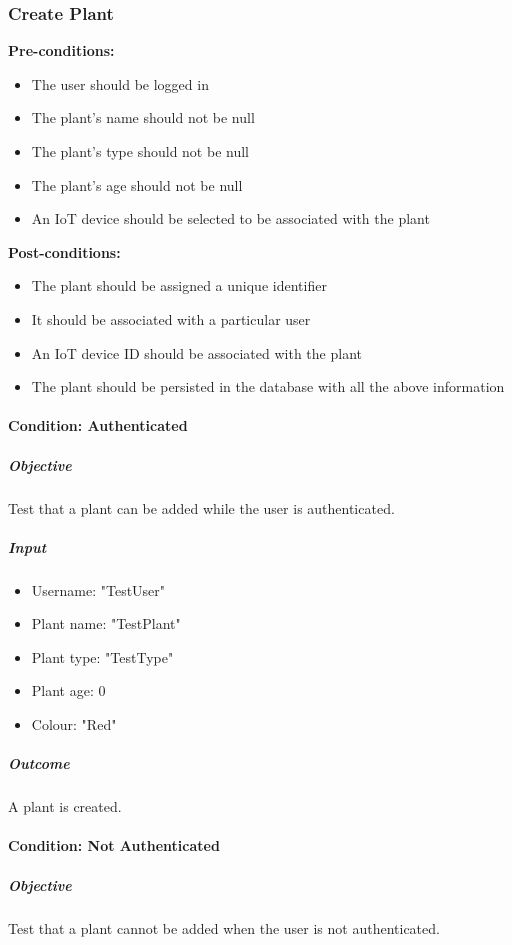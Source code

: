 \documentclass{article}
\begin{document}
		\subsubsection{Create Plant}
		
		\textbf{Pre-conditions:}
		\begin{itemize}
			\item The user should be logged in
			\item The plant's name should not be null
			\item The plant's type should not be null
			\item The plant's age should not be null
			\item An IoT device should be selected to be associated with the plant
		\end{itemize}
		\textbf{Post-conditions:}
		\begin{itemize}
			\item The plant should be assigned a unique identifier
			\item It should be associated with a particular user
			\item An IoT device ID should be associated with the plant
			\item The plant should be persisted in the database with all the above information
		\end{itemize}
			
		\paragraph{Condition: Authenticated}
		\subparagraph{Objective}
		Test that a plant can be added while the user is authenticated.
		
		\subparagraph{Input}
		\begin{itemize}
			\item Username: "TestUser"
			\item Plant name: "TestPlant"
			\item Plant type: "TestType"
			\item Plant age: 0
			\item Colour: "Red"
		\end{itemize}
		
		\subparagraph{Outcome}
		A plant is created.
		
		\paragraph{Condition: Not Authenticated}
		\subparagraph{Objective}
		Test that a plant cannot be added when the user is not authenticated.
		
\end{document}
